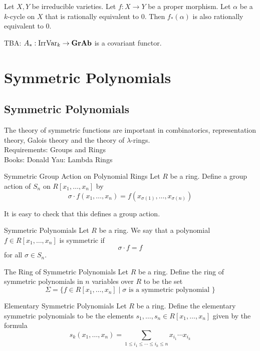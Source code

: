 \documentclass[a4paper]{article}
\begin{document}
\begin{thm}{}{} Let $X,Y$ be irreducible varieties. Let $f:X\to Y$ be a proper morphism. Let $\alpha$ be a $k$-cycle on $X$ that is rationally equivalent to $0$. Then $f_\ast(\alpha)$ is also rationally equivalent to $0$. 
\end{thm}

TBA: $A_\ast:\text{IrrVar}_k\to\bold{GrAb}$ is a covariant functor. 

\pagebreak
\section{Symmetric Polynomials}
\subsection{Symmetric Polynomials}
The theory of symmetric functions are important in combinatorics, representation theory, Galois theory and the theory of $\lambda$-rings. \\

Requirements: Groups and Rings\\
Books: Donald Yau: Lambda Rings

\begin{defn}{Symmetric Group Action on Polynomial Rings}{} Let $R$ be a ring. Define a group action of $S_n$ on $R[x_1,\dots,x_n]$ by $$\sigma\cdot f(x_1,\dots,x_n)=f(x_{\sigma(1)},\dots,x_{\sigma(n)})$$
\end{defn}

It is easy to check that this defines a group action. 

\begin{defn}{Symmetric Polynomials}{} Let $R$ be a ring. We say that a polynomial $f\in R[x_1,\dots,x_n]$ is symmetric if $$\sigma\cdot f=f$$ for all $\sigma\in S_n$. 
\end{defn}

\begin{defn}{The Ring of Symmetric Polynomials}{} Let $R$ be a ring. Define the ring of symmetric polynomials in $n$ variables over $R$ to be the set $$\Sigma=\{f\in R[x_1,\dots,x_n]\;|\;\sigma\text{ is a symmetric polynomial }\}$$
\end{defn}

\begin{defn}{Elementary Symmetric Polynomials}{} Let $R$ be a ring. Define the elementary symmetric polynomials to be the elements $s_1,\dots,s_n\in R[x_1,\dots,x_n]$ given by the formula $$s_k(x_1,\dots,x_n)=\sum_{1\leq i_1\leq\cdots\leq i_k\leq n}x_{i_1}\cdots x_{i_k}$$
\end{defn}
\end{document}
